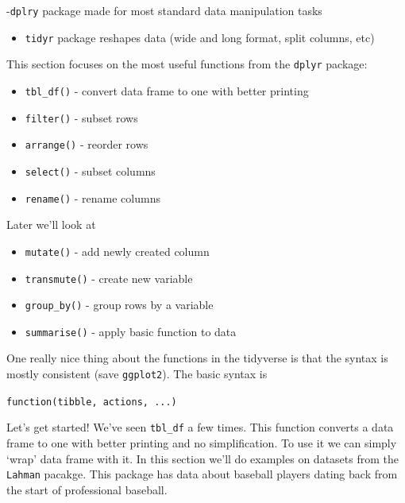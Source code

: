 \documentclass[
]{book}
\providecommand{\tightlist}{%
  \setlength{\itemsep}{0pt}\setlength{\parskip}{0pt}}
\theoremstyle{definition}
\theoremstyle{definition}
\theoremstyle{definition}
\theoremstyle{remark}
\begin{document}
-\texttt{dplry} package made for most standard data manipulation tasks

\begin{itemize}
\tightlist
\item
  \texttt{tidyr} package reshapes data (wide and long format, split columns, etc)
\end{itemize}

This section focuses on the most useful functions from the \texttt{dplyr} package:

\begin{itemize}
\tightlist
\item
  \texttt{tbl\_df()} - convert data frame to one with better printing\\
\item
  \texttt{filter()} - subset rows\\
\item
  \texttt{arrange()} - reorder rows\\
\item
  \texttt{select()} - subset columns\\
\item
  \texttt{rename()} - rename columns
\end{itemize}

Later we'll look at

\begin{itemize}
\tightlist
\item
  \texttt{mutate()} - add newly created column\\
\item
  \texttt{transmute()} - create new variable\\
\item
  \texttt{group\_by()} - group rows by a variable\\
\item
  \texttt{summarise()} - apply basic function to data
\end{itemize}

One really nice thing about the functions in the tidyverse is that the syntax is mostly consistent (save \texttt{ggplot2}). The basic syntax is

\texttt{function(tibble,\ actions,\ ...)}

Let's get started! We've seen \texttt{tbl\_df} a few times. This function converts a data frame to one with better printing and no simplification. To use it we can simply `wrap' data frame with it. In this section we'll do examples on datasets from the \texttt{Lahman} pacakge. This package has data about baseball players dating back from the start of professional baseball.
\end{document}
